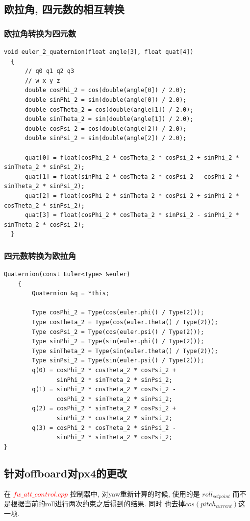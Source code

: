 \subsection{欧拉角, 四元数的相互转换}
\subsubsection{欧拉角转换为四元数}

\begin{lstlisting}[title=欧拉角转换为四元数]
  void euler_2_quaternion(float angle[3], float quat[4])
  {
      // q0 q1 q2 q3
      // w x y z
      double cosPhi_2 = cos(double(angle[0]) / 2.0);
      double sinPhi_2 = sin(double(angle[0]) / 2.0);
      double cosTheta_2 = cos(double(angle[1]) / 2.0);
      double sinTheta_2 = sin(double(angle[1]) / 2.0);
      double cosPsi_2 = cos(double(angle[2]) / 2.0);
      double sinPsi_2 = sin(double(angle[2]) / 2.0);
      
      quat[0] = float(cosPhi_2 * cosTheta_2 * cosPsi_2 + sinPhi_2 * sinTheta_2 * sinPsi_2);
      quat[1] = float(sinPhi_2 * cosTheta_2 * cosPsi_2 - cosPhi_2 * sinTheta_2 * sinPsi_2);
      quat[2] = float(cosPhi_2 * sinTheta_2 * cosPsi_2 + sinPhi_2 * cosTheta_2 * sinPsi_2);
      quat[3] = float(cosPhi_2 * cosTheta_2 * sinPsi_2 - sinPhi_2 * sinTheta_2 * cosPsi_2);
  }  
\end{lstlisting}

\subsubsection{四元数转换为欧拉角}
\begin{lstlisting}[title=四元数转换为欧拉角]
  Quaternion(const Euler<Type> &euler)
    {
        Quaternion &q = *this;
    
        Type cosPhi_2 = Type(cos(euler.phi() / Type(2)));
        Type cosTheta_2 = Type(cos(euler.theta() / Type(2)));
        Type cosPsi_2 = Type(cos(euler.psi() / Type(2)));
        Type sinPhi_2 = Type(sin(euler.phi() / Type(2)));
        Type sinTheta_2 = Type(sin(euler.theta() / Type(2)));
        Type sinPsi_2 = Type(sin(euler.psi() / Type(2)));
        q(0) = cosPhi_2 * cosTheta_2 * cosPsi_2 +
               sinPhi_2 * sinTheta_2 * sinPsi_2;
        q(1) = sinPhi_2 * cosTheta_2 * cosPsi_2 -
               cosPhi_2 * sinTheta_2 * sinPsi_2;
        q(2) = cosPhi_2 * sinTheta_2 * cosPsi_2 +
               sinPhi_2 * cosTheta_2 * sinPsi_2;
        q(3) = cosPhi_2 * cosTheta_2 * sinPsi_2 -
               sinPhi_2 * sinTheta_2 * cosPsi_2;
}
\end{lstlisting}

\subsection{针对offboard对px4的更改}
在 \textcolor{red}{$fw\_att\_control.cpp$} 控制器中, 对yaw重新计算的时候, 使用的是 $roll_{setpoint}$ 而不是根据当前的roll进行两次约束之后得到的结果. 同时
也去掉$cos(pitch_{current})$这一项.
